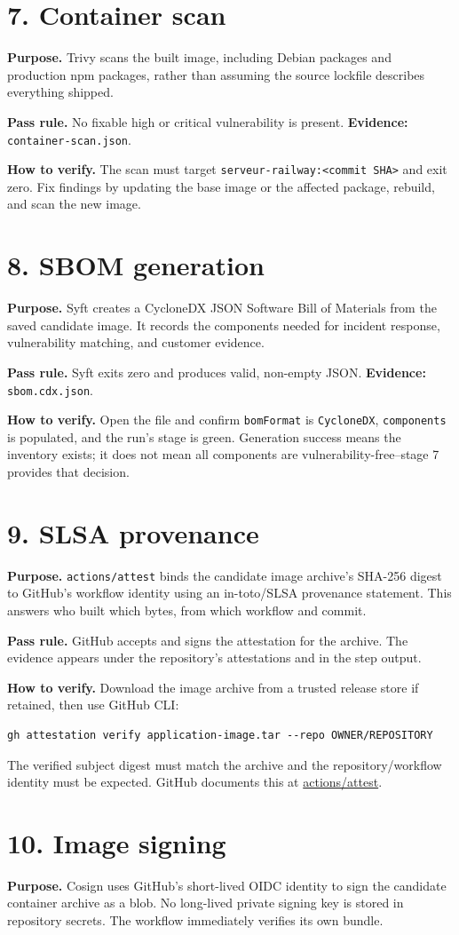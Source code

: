 \documentclass[11pt,a4paper]{article}
\newcommand{\stage}[2]{\section{#1. #2}}
\newcommand{\evidence}[1]{\textbf{Evidence:} \texttt{#1}}
\begin{document}
\stage{7}{Container scan}

\textbf{Purpose.} Trivy scans the built image, including Debian packages and production npm packages, rather than assuming the source lockfile describes everything shipped.

\textbf{Pass rule.} No fixable high or critical vulnerability is present. \evidence{container-scan.json}.

\textbf{How to verify.} The scan must target \texttt{serveur-railway:<commit SHA>} and exit zero. Fix findings by updating the base image or the affected package, rebuild, and scan the new image.

\stage{8}{SBOM generation}

\textbf{Purpose.} Syft creates a CycloneDX JSON Software Bill of Materials from the saved candidate image. It records the components needed for incident response, vulnerability matching, and customer evidence.

\textbf{Pass rule.} Syft exits zero and produces valid, non-empty JSON. \evidence{sbom.cdx.json}.

\textbf{How to verify.} Open the file and confirm \texttt{bomFormat} is \texttt{CycloneDX}, \texttt{components} is populated, and the run's stage is green. Generation success means the inventory exists; it does not mean all components are vulnerability-free--stage 7 provides that decision.

\stage{9}{SLSA provenance}

\textbf{Purpose.} \texttt{actions/attest} binds the candidate image archive's SHA-256 digest to GitHub's workflow identity using an in-toto/SLSA provenance statement. This answers who built which bytes, from which workflow and commit.

\textbf{Pass rule.} GitHub accepts and signs the attestation for the archive. The evidence appears under the repository's attestations and in the step output.

\textbf{How to verify.} Download the image archive from a trusted release store if retained, then use GitHub CLI:
\begin{lstlisting}
gh attestation verify application-image.tar --repo OWNER/REPOSITORY
\end{lstlisting}
The verified subject digest must match the archive and the repository/workflow identity must be expected. GitHub documents this at \href{https://github.com/actions/attest}{actions/attest}.

\stage{10}{Image signing}

\textbf{Purpose.} Cosign uses GitHub's short-lived OIDC identity to sign the candidate container archive as a blob. No long-lived private signing key is stored in repository secrets. The workflow immediately verifies its own bundle.
\end{document}
